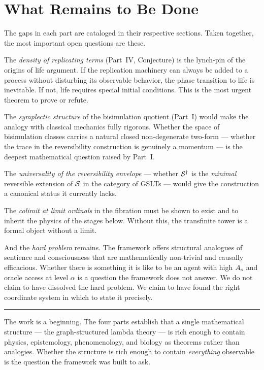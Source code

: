 \chapter*{What Remains to Be Done}

The gaps in each part are cataloged in their respective sections.
Taken together, the most important open questions are these.

The \emph{density of replicating terms} (Part~IV, Conjecture) is
the lynch-pin of the origins of life argument.
If the replication machinery can always be added to a process
without disturbing its observable behavior, the phase transition
to life is inevitable.
If not, life requires special initial conditions.
This is the most urgent theorem to prove or refute.

The \emph{symplectic structure} of the bisimulation quotient
(Part~I) would make the analogy with classical mechanics fully
rigorous.
Whether the space of bisimulation classes carries a natural
closed non-degenerate two-form --- whether the trace in the
reversibility construction is genuinely a momentum --- is the
deepest mathematical question raised by Part~I.

The \emph{universality of the reversibility envelope} --- whether
$\mathcal{S}^\dagger$ is the \emph{minimal} reversible extension of
$\mathcal{S}$ in the category of GSLTs --- would give the construction
a canonical status it currently lacks.

The \emph{colimit at limit ordinals} in the fibration must be
shown to exist and to inherit the physics of the stages below.
Without this, the transfinite tower is a formal object without
a limit.

And the \emph{hard problem} remains.
The framework offers structural analogues of sentience and
consciousness that are mathematically non-trivial and causally
efficacious.
Whether there is something it is like to be an agent with high
$A_{\mathrm{s}}$ and oracle access at level $\alpha$ is a question the
framework does not answer.
We do not claim to have dissolved the hard problem.
We claim to have found the right coordinate system in which to
state it precisely.

\vspace{2em}
\noindent\hrule
\vspace{1em}

\noindent
The work is a beginning.
The four parts establish that a single mathematical structure ---
the graph-structured lambda theory --- is rich enough to contain
physics, epistemology, phenomenology, and biology as theorems
rather than analogies.
Whether the structure is rich enough to contain \emph{everything}
observable is the question the framework was built to ask.
